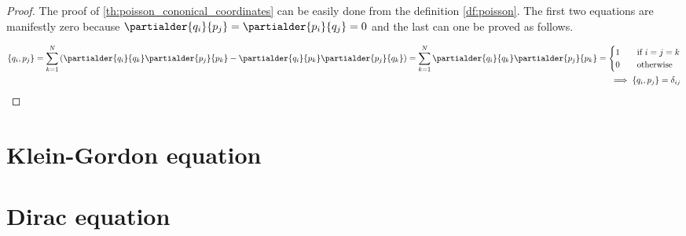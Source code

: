 \begin{proof}
    The proof of \ref{th:poisson_cononical_coordinates} can be easily done from the definition \ref{df:poisson}. 
    The first two equations are manifestly zero because $\partialder{q_{i}}{p_{j}} = \partialder{p_{i}}{q_{j}} = 0$
    and the last can one be proved as follows.

    \begin{equation}
        \begin{split}
            \{q_{i}, p_{j}\} = \sum_{k=1}^{N}\left(\partialder{q_{i}}{q_{k}} \partialder{p_{j}}{p_{k}} - \partialder{q_{i}}{p_{k}} \partialder{p_{j}}{q_{k}}\right) 
            = \sum_{k=1}^{N} \partialder{q_{i}}{q_{k}} \partialder{p_{j}}{p_{k}} = 
            \begin{cases}
                1  & \quad \text{if } i = j = k \\
                0  & \quad \text{otherwise}
            \end{cases} \\
            \implies \{q_{i}, p_{j}\} = \delta_{ij}
        \end{split}
    \end{equation}
\end{proof}


    
\section{Klein-Gordon equation}

\section{Dirac equation}

